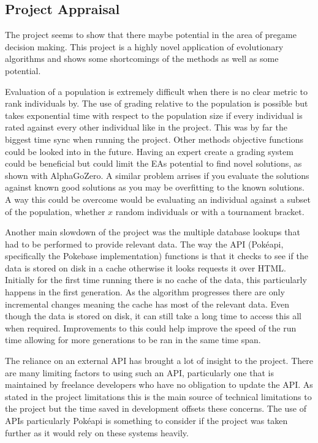 \documentclass[a4paper]{article}
\newcommand{\Pokeapi}{Pok\'{e}api}
\begin{document}
\subsection{Project Appraisal}
\par
The project seems to show that there maybe potential in the area of pregame decision making.
This project is a highly novel application of evolutionary algorithms and shows some shortcomings of the methods as well as some potential.
\par
Evaluation of a population is extremely difficult when there is no clear metric to rank individuals by.
The use of grading relative to the population is possible but takes exponential time with respect to the population size if every individual is rated against every other individual like in the project.
This was by far the biggest time sync when running the project.
Other methods objective functions could be looked into in the future.
Having an expert create a grading system could be beneficial but could limit the EAs potential to find novel solutions, as shown with AlphaGoZero.
A similar problem arrises if you evaluate the solutions against known good solutions as you may be overfitting to the known solutions.
A way this could be overcome would be evaluating an individual against a subset of the population, whether $x$ random individuals or with a tournament bracket.
\par
Another main slowdown of the project was the multiple database lookups that had to be performed to provide relevant data.
The way the API (\Pokeapi{}, specifically the Pokebase implementation) functions is that it checks to see if the data is stored on disk in a cache otherwise it looks requests it over HTML\@.
Initially for the first time running there is no cache of the data, this particularly happens in the first generation.
As the algorithm progresses there are only incremental changes meaning the cache has most of the relevant data.
Even though the data is stored on disk, it can still take a long time to access this all when required.
Improvements to this could help improve the speed of the run time allowing for more generations to be ran in the same time span.
\par
The reliance on an external API has brought a lot of insight to the project.
There are many limiting factors to using such an API, particularly one that is maintained by freelance developers who have no obligation to update the API\@.
As stated in the project limitations this is the main source of technical limitations to the project but the time saved in development offsets these concerns.
The use of APIs particularly \Pokeapi{} is something to consider if the project was taken further as it would rely on these systems heavily.
\end{document}
